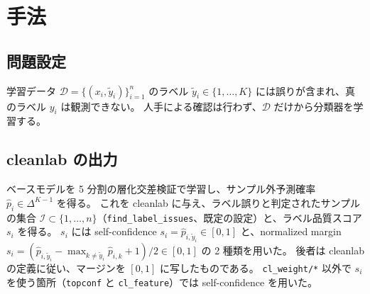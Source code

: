 \documentclass[a4paper,10pt]{ltjsarticle}
\newcommand{\method}[1]{\texttt{#1}}
\newcommand{\cl}{\textsf{cleanlab}}
\begin{document}
\section{手法}

\subsection{問題設定}
学習データ $\mathcal{D} = \{(x_i, \tilde{y}_i)\}_{i=1}^{n}$ のラベル $\tilde{y}_i \in \{1,\dots,K\}$ には誤りが含まれ、真のラベル $y_i$ は観測できない。
人手による確認は行わず、$\mathcal{D}$ だけから分類器を学習する。

\subsection{\cl{} の出力}
ベースモデルを 5 分割の層化交差検証で学習し、サンプル外予測確率 $\hat{p}_i \in \Delta^{K-1}$ を得る。
これを \cl{} に与え、ラベル誤りと判定されたサンプルの集合 $\mathcal{I} \subset \{1,\dots,n\}$（\texttt{find\_label\_issues}、既定の設定）と、ラベル品質スコア $s_i$ を得る。
$s_i$ には self-confidence $s_i = \hat{p}_{i,\tilde{y}_i} \in [0,1]$ と、normalized margin $s_i = (\hat{p}_{i,\tilde{y}_i} - \max_{k \neq \tilde{y}_i} \hat{p}_{i,k} + 1)/2 \in [0,1]$ の 2 種類を用いた。
後者は \cl{} の定義に従い、マージンを $[0,1]$ に写したものである。
\method{cl\_weight/*} 以外で $s_i$ を使う箇所（\method{topconf} と \method{cl\_feature}）では self-confidence を用いた。
\end{document}
